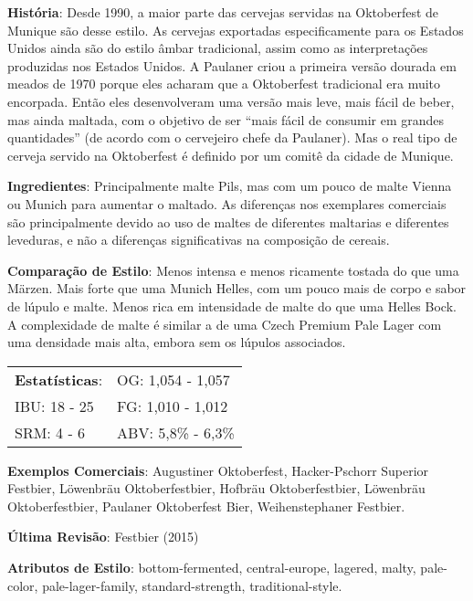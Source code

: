 \textbf{História}: Desde 1990, a maior parte das cervejas servidas na Oktoberfest de Munique são desse estilo. As cervejas exportadas especificamente para os Estados Unidos ainda são do estilo âmbar tradicional, assim como as interpretações produzidas nos Estados Unidos. A Paulaner criou a primeira versão dourada em meados de 1970 porque eles acharam que a Oktoberfest tradicional era muito encorpada. Então eles desenvolveram uma versão mais leve, mais fácil de beber, mas ainda maltada, com o objetivo de ser “mais fácil de consumir em grandes quantidades” (de acordo com o cervejeiro chefe da Paulaner). Mas o real tipo de cerveja servido na Oktoberfest é definido por um comitê da cidade de Munique.

\textbf{Ingredientes}: Principalmente malte Pils, mas com um pouco de malte Vienna ou Munich para aumentar o maltado. As diferenças nos exemplares comerciais são principalmente devido ao uso de maltes de diferentes maltarias e diferentes leveduras, e não a diferenças significativas na composição de cereais.

\textbf{Comparação de Estilo}: Menos intensa e menos ricamente tostada do que uma Märzen. Mais forte que uma Munich Helles, com um pouco mais de corpo e sabor de lúpulo e malte. Menos rica em intensidade de malte do que uma Helles Bock. A complexidade de malte é similar a de uma Czech Premium Pale Lager com uma densidade mais alta, embora sem os lúpulos associados.

\begin{tabular}{@{}p{35mm}p{35mm}@{}}
  \textbf{Estatísticas}: & OG: 1,054 - 1,057 \\
  IBU: 18 - 25  & FG: 1,010 - 1,012  \\
  SRM: 4 - 6   & ABV: 5,8\% - 6,3\%
\end{tabular}

\textbf{Exemplos Comerciais}: Augustiner Oktoberfest, Hacker-Pschorr Superior Festbier, Löwenbräu Oktoberfestbier, Hofbräu Oktoberfestbier, Löwenbräu Oktoberfestbier, Paulaner Oktoberfest Bier, Weihenstephaner Festbier.

\textbf{Última Revisão}: Festbier (2015)

\textbf{Atributos de Estilo}: bottom-fermented, central-europe, lagered, malty, pale-color, pale-lager-family, standard-strength, traditional-style.